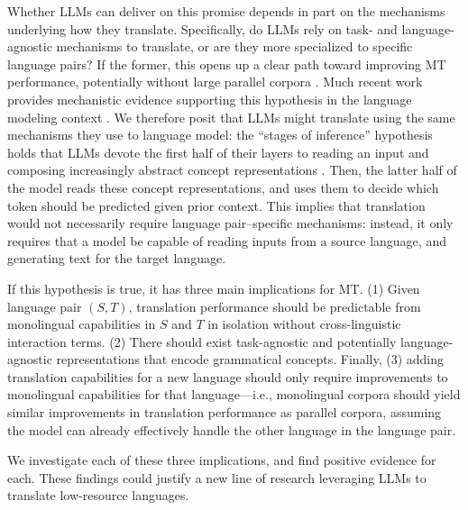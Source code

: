 \documentclass[11pt]{article}
\newcommand{\aaron}[1]{\todo[inline, color=ForestGreen!30, author=Aaron]{#1}}
\begin{document}
Whether LLMs can deliver on this promise depends in part on the mechanisms underlying how they translate. Specifically, do LLMs rely on task- and language-agnostic mechanisms to translate, or are they more specialized to specific language pairs? If the former, this opens up a clear path toward improving MT performance, potentially without large parallel corpora \citep{artetxe2018unsupervised}. Much recent work provides mechanistic evidence supporting this hypothesis in the language modeling context \citep{wendler-etal-2024-llamas,brinkmann-etal-2025-large,wu2025the}. We therefore posit that LLMs might translate using the same mechanisms they use to language model: the ``stages of inference'' hypothesis  \citep{lad2024the} holds that LLMs devote the first half of their layers to reading an input and composing increasingly abstract concept representations . Then, the latter half of the model reads these concept representations, and uses them to decide which token should be predicted given prior context. This implies that translation would not necessarily require language pair--specific mechanisms: instead, it only requires that a model be capable of reading inputs from a source language, and generating text for the target language.

If this hypothesis is true, it has three main implications for MT. (1) Given language pair $(S,T)$, translation performance should be predictable from monolingual capabilities in $S$ and $T$ in isolation without cross-linguistic interaction terms. (2) There should exist task-agnostic and potentially language-agnostic representations that encode grammatical concepts. Finally, (3) adding translation capabilities for a new language should only require improvements to monolingual capabilities for that language---i.e., monolingual corpora should yield similar improvements in translation performance as parallel corpora, assuming the model can already effectively handle the other language in the language pair.

We investigate each of these three implications, and find positive evidence for each. These findings could justify a new line of research leveraging LLMs to translate low-resource languages.
\end{document}
